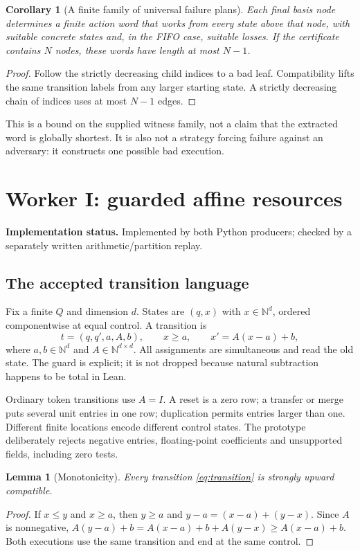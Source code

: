 \documentclass[11pt,a4paper]{article}
\newtheorem{lemma}[theorem]{Lemma}
\newtheorem{corollary}[theorem]{Corollary}
\theoremstyle{definition}
\newcommand{\N}{\mathbb N}
\newcommand{\status}[1]{\noindent\textbf{Implementation status.} #1\par}
\begin{document}
\begin{corollary}[A finite family of universal failure plans]
\label{cor:plans}
Each final basis node determines a finite action word that works from every
state above that node, with suitable concrete states and, in the FIFO case,
suitable losses. If the certificate contains $N$ nodes, these words have
length at most $N-1$.
\end{corollary}
\begin{proof}
Follow the strictly decreasing child indices to a bad leaf. Compatibility
lifts the same transition labels from any larger starting state. A strictly
decreasing chain of indices uses at most $N-1$ edges.
\end{proof}
This is a bound on the supplied witness family, not a claim that the extracted
word is globally shortest. It is also not a strategy forcing failure against
an adversary: it constructs one possible bad execution.

\section{Worker I: guarded affine resources}
\label{sec:resource}
\status{Implemented by both Python producers; checked by a separately written arithmetic/partition replay.}

\subsection{The accepted transition language}
Fix a finite $Q$ and dimension $d$. States are $(q,x)$ with $x\in\N^d$, ordered
componentwise at equal control. A transition is
\begin{equation}
 t=(q,q',a,A,b),\qquad
 x\geq a,\qquad x'=A(x-a)+b,
 \label{eq:transition}
\end{equation}
where $a,b\in\N^d$ and $A\in\N^{d\times d}$. All assignments are simultaneous
and read the old state. The guard is explicit; it is not dropped because
natural subtraction happens to be total in Lean.

Ordinary token transitions use $A=I$. A reset is a zero row; a transfer or
merge puts several unit entries in one row; duplication permits entries
larger than one. Different finite locations encode different control states.
The prototype deliberately rejects negative entries, floating-point
coefficients and unsupported fields, including zero tests.

\begin{lemma}[Monotonicity]
\label{lem:resource-mono}
Every transition \eqref{eq:transition} is strongly upward compatible.
\end{lemma}
\begin{proof}
If $x\leq y$ and $x\geq a$, then $y\geq a$ and
$y-a=(x-a)+(y-x)$. Since $A$ is nonnegative,
$A(y-a)+b=A(x-a)+b+A(y-x)\geq A(x-a)+b$. Both executions use the same
transition and end at the same control.
\end{proof}
\end{document}
